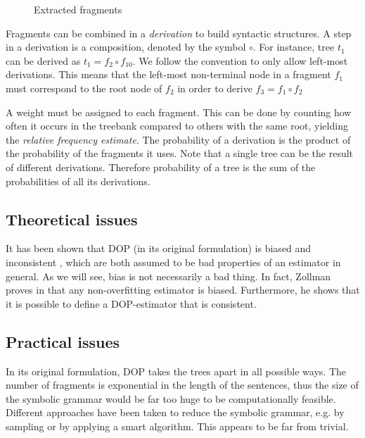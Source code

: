 \begin{figure}[h!]
\center 
\caption{Extracted fragments}
\label{f:fragments}
\end{figure}


Fragments can be combined in a \emph{derivation} to build syntactic structures. A step in a derivation is a composition, denoted by the symbol $\circ$. For instance, tree $t_1$ can be derived as $t_1=f_2\circ f_{10}$. We follow the convention to only allow left-most derivations. This means that the left-most non-terminal node in a fragment $f_1$ must correspond to the root node of $f_2$ in order to derive $f_3=f_1\circ f_2$

A weight must be assigned to each fragment. This can be done by counting how often it occurs in the treebank compared to others with the same root, yielding the \emph{relative frequency estimate}. The probability of a derivation is the product of the probability of the fragments it uses. Note that a single tree can be the result of different derivations. Therefore probability of a tree is the sum of the probabilities of all its derivations.

\subsection{Theoretical issues}
It has been shown that DOP (in its original formulation) is biased and inconsistent \cite{johnson2002}, which are both assumed to be bad properties of an estimator in general. As we will see, bias is not necessarily a bad thing. In fact, Zollman proves in  \cite{zollmann2005} that any non-overfitting estimator is biased. Furthermore, he shows that it is possible to define a DOP-estimator that is consistent.


\subsection{Practical issues}
In its original formulation, DOP takes the trees apart in all possible ways. The number of fragments is exponential in the length of the sentences, thus the size of the symbolic grammar would be far too huge to be computationally feasible. 
Different approaches have been taken to reduce the symbolic grammar, e.g. by sampling or by applying a smart algorithm. This appears to be far from trivial.


